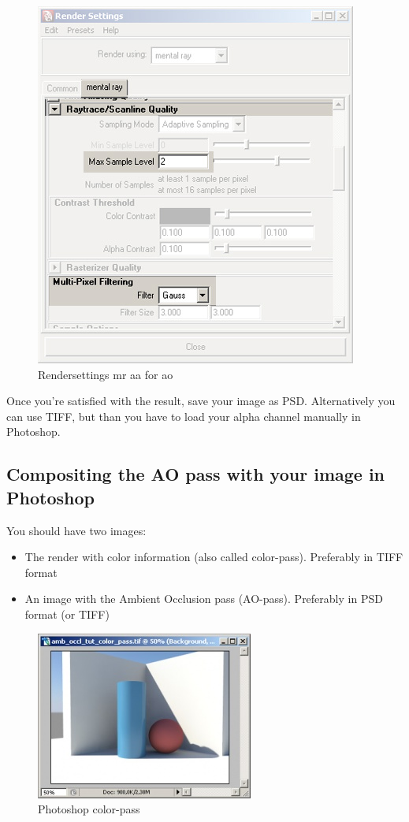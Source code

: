 \documentclass[10pt,a4paper]{article}
\begin{document}
\begin{figure}[tbh]
\centering
\includegraphics[width=0.5\linewidth]{figure/Rendersettings_mr_aa_for_ao}
\caption{Rendersettings mr aa for ao}
\label{fig:rendersettingsmraaforao}
\end{figure}

Once you're satisfied with the result, save your image as PSD. Alternatively you can use TIFF, but than you have to load your alpha channel manually in Photoshop.

\subsection{Compositing the AO pass with your image in Photoshop}
You should have two images:

\begin{itemize}
	\item The render with color information (also called color-pass). Preferably in TIFF format
	\item An image with the Ambient Occlusion pass (AO-pass). Preferably in PSD format (or TIFF)
\end{itemize}

\begin{figure}[tbh]
\centering
\includegraphics[width=0.5\linewidth]{figure/Photoshop_color-pass}
\caption{Photoshop color-pass}
\label{fig:photoshopcolor-pass}
\end{figure}
\end{document}
